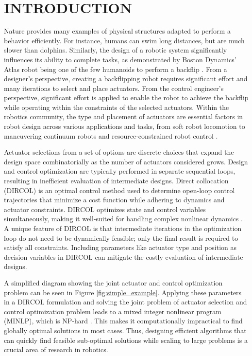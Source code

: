 %
%
%
\section{INTRODUCTION}

Nature provides many examples of physical structures adapted to perform a behavior efficiently. For instance, humans can swim long distances, but are much slower than dolphins. Similarly, the design of a robotic system significantly influences its ability to complete tasks, as demonstrated by Boston Dynamics’ Atlas robot being one of the few humanoids to perform a backflip \cite{noauthor_leaps_nodate}. From a designer’s perspective, creating a backflipping robot requires significant effort and many iterations to select and place actuators. From the control engineer’s perspective, significant effort is applied to enable the robot to achieve the backflip while operating within the constraints of the selected actuators. Within the robotics community, the type and placement of actuators are essential factors in robot design across various applications and tasks, from soft robot locomotion \cite{Bhatia2021} to maneuvering continuum robots \cite{baykal_asymptotically_2019, a_kuntz_kinematic_2018, c_bergeles_concentric_2015, t_anor_algorithms_2011, j_-t_lin_generalized_2022, morimoto_toward_2018, s_niyaz_optimizing_2019} and resource-constrained robot control \cite{Seifried2012}. 

Actuator selections from a set of options are discrete choices that expand the design space combinatorially as the number of actuators considered grows. Design and control optimization are typically performed in separate sequential loops, resulting in inefficient evaluation of intermediate designs. Direct collocation (DIRCOL) is an optimal control method used to determine open-loop control trajectories that minimize a cost function while adhering to dynamics and actuator constraints. DIRCOL optimizes state and control variables simultaneously, making it well-suited for handling complex nonlinear dynamics \cite{hargraves1987}. A unique feature of DIRCOL is that intermediate iterations in the optimization loop do not need to be dynamically feasible; only the final result is required to satisfy all constraints. Including parameters like actuator type and position as decision variables in DIRCOL can mitigate the costly evaluation of intermediate designs.

A simplified diagram showing the joint actuator and control optimization problem can be seen in Figure \ref{fig:simple_example}. Applying these parameters in a DIRCOL formulation and solving the joint problem of actuator selection and control optimization problem leads to a mixed integer nonlinear program (MINLP), which is NP-hard \cite{olshevsky2014minimal}. This makes it computationally impractical to find globally optimal solutions in most cases. Thus, designing efficient algorithms that can quickly find feasible sub-optimal solutions while scaling to large problems is a crucial area of research in robotics. 

